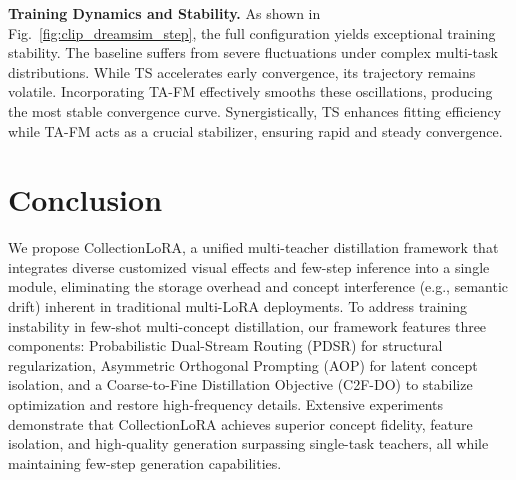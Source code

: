 \documentclass{llmxive}
\makeatletter
\providecommand{\ECCVyear}{\eccv@year\xspace}
\makeatother
\begin{document}
\noindent
\textbf{Training Dynamics and Stability.}
As shown in Fig.~\ref{fig:clip_dreamsim_step},  the full configuration yields exceptional training stability. The baseline suffers from severe fluctuations under complex multi-task distributions. While TS accelerates early convergence, its trajectory remains volatile. Incorporating TA-FM effectively smooths these oscillations, producing the most stable convergence curve. Synergistically, TS enhances fitting efficiency while TA-FM acts as a crucial stabilizer, ensuring rapid and steady convergence.










\section{Conclusion}
\label{sec:conclusion}
We propose CollectionLoRA, a unified multi-teacher distillation framework that integrates diverse customized visual effects and few-step inference into a single module, eliminating the storage overhead and concept interference (e.g., semantic drift) inherent in traditional multi-LoRA deployments. To address training instability in few-shot multi-concept distillation, our framework features three components: Probabilistic Dual-Stream Routing (PDSR) for structural regularization, Asymmetric Orthogonal Prompting  (AOP) for latent concept isolation, and a Coarse-to-Fine Distillation Objective (C2F-DO) to stabilize optimization and restore high-frequency details. Extensive experiments demonstrate that CollectionLoRA achieves superior concept fidelity, feature isolation, and high-quality generation surpassing single-task teachers, all while maintaining few-step generation capabilities.






% 
%
%


\end{document}
